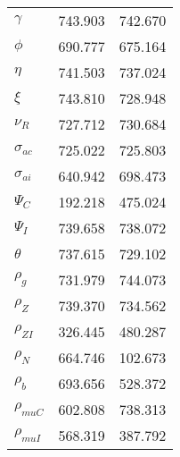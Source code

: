 \begin{center}
\begin{longtable}{lcc}
$ \gamma                  $	 & 	     743.903	 & 	     742.670 \\ 
$ {\phi}                  $	 & 	     690.777	 & 	     675.164 \\ 
$ {\eta}                  $	 & 	     741.503	 & 	     737.024 \\ 
$ \xi                     $	 & 	     743.810	 & 	     728.948 \\ 
$ {\nu_R}                 $	 & 	     727.712	 & 	     730.684 \\ 
$ {\sigma_{ac}}           $	 & 	     725.022	 & 	     725.803 \\ 
$ {\sigma_{ai}}           $	 & 	     640.942	 & 	     698.473 \\ 
$ {\Psi_{C}}              $	 & 	     192.218	 & 	     475.024 \\ 
$ {\Psi_I}                $	 & 	     739.658	 & 	     738.072 \\ 
$ {\theta}                $	 & 	     737.615	 & 	     729.102 \\ 
$ {\rho_g}                $	 & 	     731.979	 & 	     744.073 \\ 
$ {\rho_Z}                $	 & 	     739.370	 & 	     734.562 \\ 
$ {\rho_{ZI}}             $	 & 	     326.445	 & 	     480.287 \\ 
$ {\rho_N}                $	 & 	     664.746	 & 	     102.673 \\ 
$ {\rho_b}                $	 & 	     693.656	 & 	     528.372 \\ 
$ {\rho_{muC}}            $	 & 	     602.808	 & 	     738.313 \\ 
$ {\rho_{muI}}            $	 & 	     568.319	 & 	     387.792 \\ 
\end{longtable}
 \end{center}
